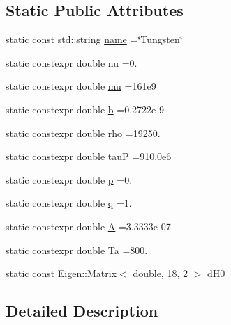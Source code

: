 \subsection*{Static Public Attributes}
\begin{DoxyCompactItemize}
\item 
static const std\+::string \hyperlink{structmodel_1_1_periodic_element_3_0174_00_01_isotropic_01_4_acb9e9239a12822c9f4cd61fe321f0c50}{name} =\char`\"{}Tungsten\char`\"{}
\item 
static constexpr double \hyperlink{structmodel_1_1_periodic_element_3_0174_00_01_isotropic_01_4_ad755cbfc4e0a78381a6284997c74162a}{nu} =0.
\item 
static constexpr double \hyperlink{structmodel_1_1_periodic_element_3_0174_00_01_isotropic_01_4_aebf78eba503b1b46147d6482dbd44be3}{mu} =161e9
\item 
static constexpr double \hyperlink{structmodel_1_1_periodic_element_3_0174_00_01_isotropic_01_4_aa28f577ac519f2bf9c874c2d37b80450}{b} =0.\+2722e-\/9
\item 
static constexpr double \hyperlink{structmodel_1_1_periodic_element_3_0174_00_01_isotropic_01_4_abee0fd68a202b509d989425423a9df45}{rho} =19250.
\item 
static constexpr double \hyperlink{structmodel_1_1_periodic_element_3_0174_00_01_isotropic_01_4_a8386552f04cc3ba4eedf99be04e411cb}{tau\+P} =910.\+0e6
\item 
static constexpr double \hyperlink{structmodel_1_1_periodic_element_3_0174_00_01_isotropic_01_4_a64606e223a62410ddc1a73fb1f88db2a}{p} =0.
\item 
static constexpr double \hyperlink{structmodel_1_1_periodic_element_3_0174_00_01_isotropic_01_4_ab51d25748f4cbefccda8d74d4cff4ba6}{q} =1.
\item 
static constexpr double \hyperlink{structmodel_1_1_periodic_element_3_0174_00_01_isotropic_01_4_a971d43c767f0019dd0b70dc4cc6f0e0b}{A} =3.\+3333e-\/07
\item 
static constexpr double \hyperlink{structmodel_1_1_periodic_element_3_0174_00_01_isotropic_01_4_a1c0ebb3100520345585f2cd559bec2c3}{Ta} =800.
\item 
static const Eigen\+::\+Matrix$<$ double, 18, 2 $>$ \hyperlink{structmodel_1_1_periodic_element_3_0174_00_01_isotropic_01_4_adc67798e64c421b46893b4cf39eb9f29}{d\+H0}
\end{DoxyCompactItemize}


\subsection{Detailed Description}
